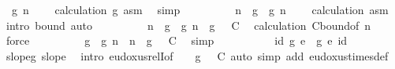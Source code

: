\begin{isabellebody}
\ {\isachardoublequoteopen}{\isacharquery}{\kern0pt}{\isasymphi}\ g\ n\ {\isachargreater}{\kern0pt}\ {}{\isachardoublequoteclose}\ \isamarkupfalse%
\ calculation\ g\ asm\ \isamarkupfalse%
\ simp\isanewline
\ \ \ \ \ \ \isamarkupfalse%
\ \isamarkupfalse%
\ {\isachardoublequoteopen}n\ {\isachargreater}{\kern0pt}\ g\ {\isacharparenleft}{\kern0pt}{\isacharquery}{\kern0pt}{\isasymphi}\ g\ n\ {\isacharminus}{\kern0pt}\ {}{\isacharparenright}{\kern0pt}{\isachardoublequoteclose}\ \isamarkupfalse%
\ calculation\ asm\ \isamarkupfalse%
\ {\isacharparenleft}{\kern0pt}intro\ {\isasymphi}{\isacharunderscore}{\kern0pt}bound{\isacharprime}{\kern0pt}{\isacharparenright}{\kern0pt}\ auto\isanewline
\ \ \ \ \ \ \isamarkupfalse%
\ \isamarkupfalse%
\ {\isachardoublequoteopen}n\ {\isasymge}\ g\ {\isacharparenleft}{\kern0pt}{\isacharquery}{\kern0pt}{\isasymphi}\ g\ n{\isacharparenright}{\kern0pt}\ {\isacharminus}{\kern0pt}\ {\isacharparenleft}{\kern0pt}{\isasymbar}g\ {}{\isasymbar}\ {\isacharplus}{\kern0pt}\ C{\isacharparenright}{\kern0pt}{\isachardoublequoteclose}\ \isamarkupfalse%
\ calculation\ C{\isacharunderscore}{\kern0pt}bound{\isacharbrackleft}{\kern0pt}of\ n{\isacharbrackright}{\kern0pt}\ \isamarkupfalse%
\ force\isanewline
\ \ \ \ \ \ \isamarkupfalse%
\ \isamarkupfalse%
\ {\isachardoublequoteopen}{\isasymbar}g\ {\isacharparenleft}{\kern0pt}{\isacharquery}{\kern0pt}{\isasymphi}\ g\ n{\isacharparenright}{\kern0pt}\ {\isacharminus}{\kern0pt}\ n{\isasymbar}\ {\isasymle}\ {\isasymbar}g\ {}{\isasymbar}\ {\isacharplus}{\kern0pt}\ C{\isachardoublequoteclose}\ \isamarkupfalse%
\ simp\isanewline
\ \ \ \ \isacommand{{\isacharbraceright}{\kern0pt}}\isamarkupfalse%
\isanewline
\ \ \ \ \isamarkupfalse%
\ id{\isacharcolon}{\kern0pt}\ {\isachardoublequoteopen}g\ {\isacharasterisk}{\kern0pt}\isactrlsub e\ {\isacharquery}{\kern0pt}{\isasymphi}\ g\ {\isasymsim}\isactrlsub e\ id{\isachardoublequoteclose}\ \isamarkupfalse%
\ slope{\isacharunderscore}{\kern0pt}g\ slope\ \isamarkupfalse%
\ {\isacharparenleft}{\kern0pt}intro\ eudoxus{\isacharunderscore}{\kern0pt}relI{\isacharbrackleft}{\kern0pt}of\ {\isacharunderscore}{\kern0pt}\ {\isacharunderscore}{\kern0pt}\ {}\ {\isachardoublequoteopen}{\isasymbar}g\ {}{\isasymbar}\ {\isacharplus}{\kern0pt}\ C{\isachardoublequoteclose}{\isacharbrackright}{\kern0pt}{\isacharparenright}{\kern0pt}\ {\isacharparenleft}{\kern0pt}auto\ simp\ add{\isacharcolon}{\kern0pt}\ eudoxus{\isacharunderscore}{\kern0pt}times{\isacharunderscore}{\kern0pt}def{\isacharparenright}{\kern0pt}\isanewline

\end{isabellebody}
